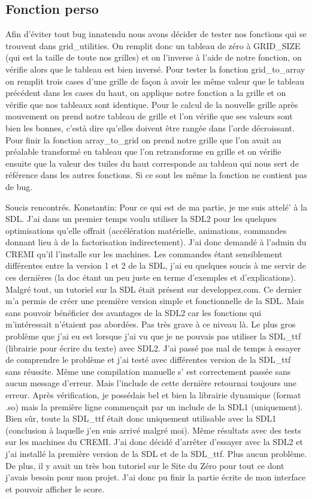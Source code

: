 \documentclass{article}
\begin{document}
\subsection{Fonction perso}
Afin d'éviter tout bug innatendu nous avons décider de tester nos fonctions qui se trouvent dans grid\_utilities.
On remplit donc un tableau de zéro à GRID\_SIZE (qui est la taille de toute nos grilles) et on l'inverse à l'aide de notre fonction, on vérifie alors que le tableau est bien inversé.
Pour tester la fonction grid\_to\_array on remplit trois cases d'une grille de façon à avoir les même valeur que le tableau précédent dans les cases du haut, on applique notre fonction a la grille et on vérifie que nos tableaux sont identique.
Pour le calcul de la nouvelle grille après mouvement on prend notre tableau de grille et l'on vérifie que ses valeurs sont bien les bonnes, c'està dire qu'elles doivent être rangée dans l'orde décroissant.
Pour finir la fonction array\_to\_grid on prend notre grille que l'on avait au préalable transformé en tableau que l'on retransforme en grille et on vérifie ensuite que la valeur des tuiles du haut corresponde au tableau qui nous sert de référence dans les autres fonctions. Si ce sont les même la fonction ne contient pas de bug.

Soucis rencontrés.
Konstantin: Pour ce qui est de ma partie, je me suis attel\'e' \`a la SDL. J'ai dans un premier temps voulu utiliser la SDL2 pour les quelques optimisations qu'elle offrait (accélération matérielle, animations, commandes donnant lieu à de la factorisation indirectement). J'ai donc demandé à l'admin du CREMI qu'il l'installe sur les machines. Les commandes étant sensiblement différentes entre la version 1 et 2 de la SDL, j'ai eu quelques soucis à me servir de ces dernières (la doc étant un peu juste en terme d'exemples et d'explications). Malgré tout, un tutoriel sur la SDL était présent sur developpez.com. Ce dernier m'a permis de créer une première version simple et fonctionnelle de la SDL. Mais sans pouvoir bénéficier des avantages de la SDL2 car les fonctions qui m'intéressait n'étaient pas abordées. Pas très grave à ce niveau là. Le plus gros problème que j'ai eu est lorsque j'ai vu que je ne pouvais pas utiliser la SDL_ttf (librairie pour écrire du texte) avec SDL2. J'ai passé pas mal de temps à essayer de comprendre le problème et j'ai testé avec différentes version de la SDL_ttf sans réussite. Même une compilation manuelle s' est correctement passée sans aucun message d'erreur. Mais l'include de cette dernière retournai toujours une erreur. Après vérification, je possédais bel et bien la librairie dynamique (format .so) mais la première ligne commençait par un include de la SDL1 (uniquement). Bien sûr, toute la SDL_ttf était donc uniquement utilisable avec la SDL1 (conclusion à laquelle j'en suis arrivé malgré moi). Même résultats avec des tests sur les machines du CREMI. J'ai donc décidé d'arrêter d'essayer avec la SDL2 et j'ai installé la première version de la SDL et de la SDL_ttf. Plus aucun problème. De plus, il y avait un très bon tutoriel sur le Site du Zéro pour tout ce dont j'avais besoin pour mon projet. J'ai donc pu finir la partie écrite de mon interface et pouvoir afficher le score.
\end{document}
